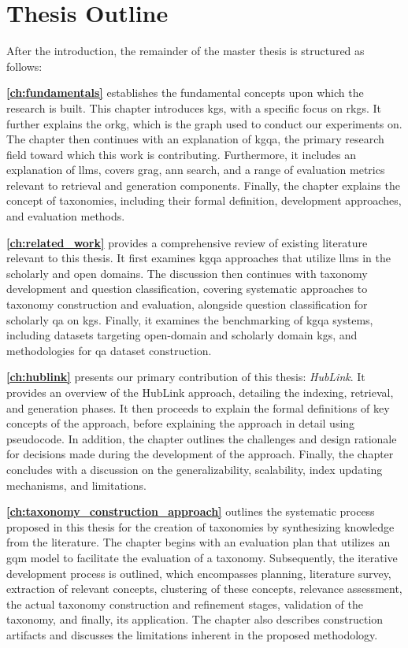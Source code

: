 
\section{Thesis Outline}

After the introduction, the remainder of the master thesis is structured as follows: 

\textbf{\autoref{ch:fundamentals}} establishes the fundamental concepts upon which the research is built. This chapter introduces \glspl{kg}, with a specific focus on \glspl{rkg}. It further explains the \gls{orkg}, which is the graph used to conduct our experiments on. The chapter then continues with an explanation of \gls{kgqa}, the primary research field toward which this work is contributing. Furthermore, it includes an explanation of \glspl{llm}, covers \gls{grag}, \gls{ann} search, and a range of evaluation metrics relevant to retrieval and generation components. Finally, the chapter explains the concept of taxonomies, including their formal definition, development approaches, and evaluation methods.

\textbf{\autoref{ch:related_work}} provides a comprehensive review of existing literature relevant to this thesis. It first examines \gls{kgqa} approaches that utilize \glspl{llm} in the scholarly and open domains. The discussion then continues with taxonomy development and question classification, covering systematic approaches to taxonomy construction and evaluation, alongside question classification for scholarly \gls{qa} on \glspl{kg}. Finally, it examines the benchmarking of \gls{kgqa} systems, including datasets targeting open-domain and scholarly domain \glspl{kg}, and methodologies for \gls{qa} dataset construction.

\textbf{\autoref{ch:hublink}} presents our primary contribution of this thesis: \emph{HubLink}. It provides an overview of the HubLink approach, detailing the indexing, retrieval, and generation phases. It then proceeds to explain the formal definitions of key concepts of the approach, before explaining the approach in detail using pseudocode. In addition, the chapter outlines the challenges and design rationale for decisions made during the development of the approach. Finally, the chapter concludes with a discussion on the generalizability, scalability, index updating mechanisms, and limitations.

\textbf{\autoref{ch:taxonomy_construction_approach}} outlines the systematic process proposed in this thesis for the creation of taxonomies by synthesizing knowledge from the literature. The chapter begins with an evaluation plan that utilizes an \gls{gqm} model to facilitate the evaluation of a taxonomy. Subsequently, the iterative development process is outlined, which encompasses planning, literature survey, extraction of relevant concepts, clustering of these concepts, relevance assessment, the actual taxonomy construction and refinement stages, validation of the taxonomy, and finally, its application. The chapter also describes construction artifacts and discusses the limitations inherent in the proposed methodology.


